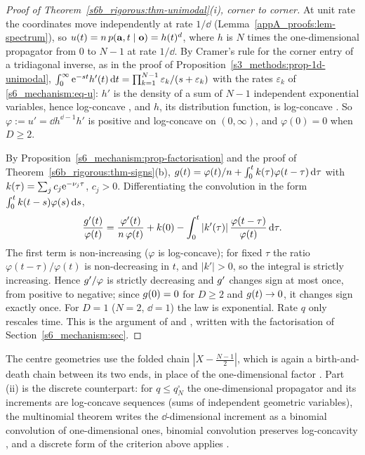 \begin{proof}[Proof of Theorem~\ref{s6b_rigorous:thm-unimodal}(i), corner to corner]
At unit rate the coordinates move independently at rate $1/\dd$ (Lemma~\ref{appA_proofs:lem-spectrum}), so
$u(t)=n\,p(\mathbf{a},t\mid\mathbf{o})=h(t)^{d}$, where $h$ is $N$ times the one-dimensional propagator from $0$ to $N-1$ at
rate $1/\dd$. By Cramer's rule for the corner entry of a tridiagonal inverse, as in the proof of
Proposition~\ref{s3_methods:prop-1d-unimodal},
$\int_0^\infty\mathrm{e}^{-st}h'(t)\,\mathrm{d} t=\prod_{k=1}^{N-1}\varepsilon_k/(s+\varepsilon_k)$ with the rates $\varepsilon_k$ of
\eqref{s6_mechanism:eq-u}: $h'$ is the density of a sum of $N-1$ independent exponential variables, hence
log-concave \citep{Ibragimov1956}, and $h$, its distribution function, is log-concave
\citep[Theorem~1]{BagnoliBergstrom2005}. So $\varphi:=u'=\dd h^{\dd-1}h'$ is positive and log-concave on $(0,\infty)$,
and $\varphi(0)=0$ when $D\ge2$.

By Proposition~\ref{s6_mechanism:prop-factorisation} and the proof of Theorem~\ref{s6b_rigorous:thm-signs}(b),
$g(t)=\varphi(t)/n+\int_0^{t}k(\tau)\varphi(t-\tau)\,\mathrm{d}\tau$ with $k(\tau)=\sum_jc_j\mathrm{e}^{-\nu_j\tau}$, $c_j>0$.
Differentiating the convolution in the form $\int_0^tk(t-s)\varphi(s)\,\mathrm{d} s$,
\[
\frac{g'(t)}{\varphi(t)}=\frac{\varphi'(t)}{n\,\varphi(t)}+k(0)-\int_0^{t}|k'(\tau)|\,\frac{\varphi(t-\tau)}{\varphi(t)}\,\mathrm{d}\tau .
\]
The first term is non-increasing ($\varphi$ is log-concave); for fixed $\tau$ the ratio $\varphi(t-\tau)/\varphi(t)$ is
non-decreasing in $t$, and $|k'|>0$, so the integral is strictly increasing. Hence $g'/\varphi$ is strictly
decreasing and $g'$ changes sign at most once, from positive to negative; since $g(0)=0$ for $D\ge2$ and
$g(t)\to0$, it changes sign exactly once. For $D=1$ ($N=2$, $\dd=1$) the law is exponential. Rate $q$ only
rescales time. This is the argument of  and , written with the
factorisation of Section~\ref{s6_mechanism:sec}.
\end{proof}

The centre geometries use the folded chain $|X-\frac{N-1}2|$, which is again a birth-and-death chain between its two
ends, in place of the one-dimensional factor . Part (ii) is the discrete counterpart: for
$q\le q_N^{\square}$ the one-dimensional propagator and its increments are log-concave sequences (sums of independent
geometric variables), the multinomial theorem writes the $\dd$-dimensional increment as a binomial convolution of
one-dimensional ones, binomial convolution preserves log-concavity \citep{DavenportPolya1949}, and a discrete form of
the criterion above applies .

